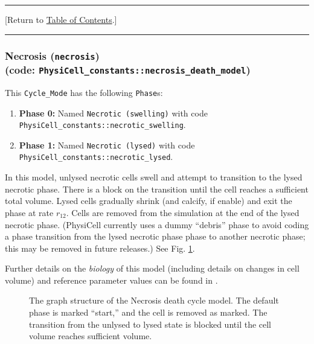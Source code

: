 \documentclass[12pt]{article}
\renewcommand{\v}{\verb}
\newcommand{\TOClink}{\begin{center}\hrule\vskip-10pt\phantom{.}\hfill[Return to \hyperlink{TOC}{Table of Contents}.]\hfill\phantom{.}\vskip3pt\hrule\end{center}}
\begin{document}
\TOClink 


\subsubsection{Necrosis (\texttt{necrosis})\\
(code: \texttt{PhysiCell\_constants::necrosis\_death\_model})}
\label{sec:Standard_Models:Necrosis}
This \v|Cycle_Mode| has the following \v|Phase|s: 
\begin{enumerate}
\item 
\textbf{Phase 0:} Named \v|Necrotic (swelling)| with code \v|PhysiCell_constants::necrotic_swelling|. 
\item
\textbf{Phase 1:} Named \v|Necrotic (lysed)| with code \v|PhysiCell_constants::necrotic_lysed|. 
\end{enumerate}
In this model, unlysed necrotic cells swell and attempt to 
transition to the lysed necrotic  phase. There is a block on the 
transition until the cell reaches a sufficient 
total volume. Lysed cells gradually shrink (and calcify, if 
enable) and exit the phase at 
rate $r_{12}$. Cells are removed 
from the simulation at the end of the lysed necrotic phase. 
(PhysiCell currently uses a dummy ``debris'' phase to avoid coding a 
phase transition from the lysed necrotic phase phase to another necrotic phase; 
this may be removed in future releases.) 
See Fig. \ref{fig:death_model:necrosis}. 

Further details on the \emph{biology} of this model (including 
details on changes in cell volume) and reference parameter values can be found in \cite{ref:PhysiCell}. 


\begin{figure}
\begin{mdframed}[style=mystyle]
\caption{The graph structure of the Necrosis death cycle model. The default phase is marked 
``start,'' and the cell is removed as marked. The transition from the 
unlysed to lysed state is blocked until the cell volume reaches sufficient volume.}
\label{fig:death_model:necrosis}
\end{mdframed}
\end{figure}
\end{document}
